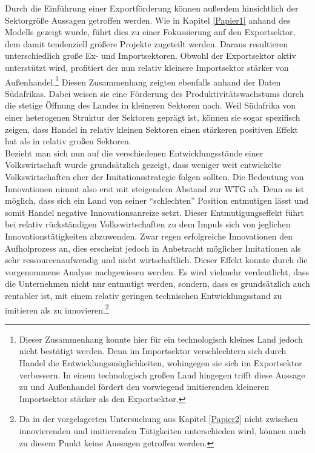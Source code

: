 Durch die Einf{\"u}hrung einer Exportf{\"o}rderung k{\"o}nnen au{\ss}erdem hinsichtlich der Sektorgr{\"o}{\ss}e Aussagen getroffen werden. Wie in Kapitel \ref{Papier1} anhand des Modells gezeigt wurde, f{\"u}hrt dies zu einer Fokussierung auf den Exportsektor, dem damit tendenziell gr{\"o}{\ss}ere Projekte zugeteilt werden. Daraus resultieren unterschiedlich gro{\ss}e Ex- und Importsektoren. Obwohl der Exportsektor aktiv unterst{\"u}tzt wird, profitiert der nun relativ kleinere Importsektor st{\"a}rker von Au{\ss}enhandel.\footnote{Dieser Zusammenhang konnte hier f{\"u}r ein technologisch kleines Land jedoch nicht best{\"a}tigt werden. Denn im Importsektor verschlechtern sich durch Handel die Entwicklungsm{\"o}glichkeiten, wohingegen sie sich im Exportsektor verbessern. In einem technologisch gro{\ss}en Land hingegen trifft diese Aussage zu und Au{\ss}enhandel f{\"o}rdert den vorwiegend imitierenden kleineren Importsektor st{\"a}rker als den Exportsektor.} Diesen Zusammenhang zeigten ebenfalls \citet{Aghion.2013} anhand der Daten S{\"u}dafrikas. 
Dabei weisen sie eine F{\"o}rderung des Produktivit{\"a}tswachstums durch die stetige {\"O}ffnung des Landes in kleineren Sektoren nach.  Weil S{\"u}dafrika von einer heterogenen Struktur der Sektoren gepr{\"a}gt ist, k{\"o}nnen sie sogar spezifisch zeigen, dass Handel in relativ kleinen Sektoren einen st{\"a}rkeren positiven Effekt hat als in relativ gro{\ss}en Sektoren.\\


Bezieht man sich nun auf die verschiedenen Entwicklungsst{\"a}nde einer Volkswirtschaft 
wurde grunds{\"a}tzlich gezeigt, dass weniger weit entwickelte Volkswirtschaften eher der Imitationsstrategie folgen sollten. Die Bedeutung von Innovationen nimmt also erst mit steigendem Abstand zur WTG ab. Denn es ist m{\"o}glich, dass sich ein Land von seiner "`schlechten"' Position entmutigen l{\"a}sst und somit Handel negative Innovationsanreize setzt. Dieser Entmutigungseffekt f{\"u}hrt bei relativ r{\"u}ckst{\"a}ndigen Volkswirtschaften zu dem Impuls sich von jeglichen Innovationst{\"a}tigkeiten abzuwenden. Zwar regen erfolgreiche Innovationen den Aufholprozess an, dies erscheint jedoch in Anbetracht m{\"o}glicher Imitationen als sehr ressourcenaufwendig und nicht wirtschaftlich.  
Dieser Effekt konnte durch die vorgenommene Analyse nachgewiesen werden. Es wird vielmehr verdeutlicht, dass die Unternehmen nicht nur entmutigt werden, sondern, dass es grunds{\"a}tzlich auch rentabler ist, mit einem relativ geringen technischen Entwicklungsstand zu imitieren als zu innovieren.\footnote{Da in der vorgelagerten Untersuchung aus Kapitel \ref{Papier2} nicht zwischen innovierenden und imitierenden T{\"a}tigkeiten unterschieden wird, k{\"o}nnen auch zu diesem Punkt keine Aussagen getroffen werden.}\\


